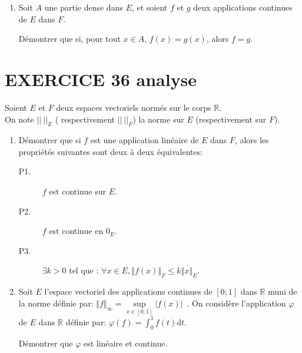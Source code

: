 \documentclass[10pt,oneside]{article}
\begin{document}
\begin{flushleft}
\begin{enumerate}
\item 
Soit $A$ une partie dense dans $E$, et soient $f$ et $g$ deux applications continues de $E$ dans $F$.

Démontrer que si, pour tout $x\in A$, $f(x)=g(x)$, alors $f=g$.
\end{enumerate}


\section*{EXERCICE 36 \:analyse }



Soient $E$ et $F$ deux espaces vectoriels normés sur le corps $\mathbb R$.\\
On note $||\:||_{E}$ ( respectivement $||\:||_{F}$) la norme sur $E$ (respectivement sur $F$).

\begin{enumerate}
\item Démontrer que si $f$ est une application linéaire de $E$ dans $F$, alors les propriétés suivantes sont deux à deux équivalentes:

	\begin{description}
	\item[P1.] $f$ est continue sur $E$.
	\item[P2.] $f$ est continue en $0_E$.
	\item[P3.] $\exists k>0$ tel que : $\forall x\in E, \left\Vert f(x)\right\Vert_{F} \leqslant k\left\Vert x\right\Vert_E$.
	\end{description}

\item Soit $E$ l'espace vectoriel des applications  continues de $[0;1]$ dans $\mathbb{R}$ muni de la norme définie par: $\Vert f\Vert_{\infty}=\sup\limits_{x\in[0;1]}|f(x)|$~.
On considère l'application $\varphi$ de $E$ dans $\mathbb{R}$ définie par: $\varphi(f)=\displaystyle\int_0^1 f(t)\text{d}t$.\bigskip

Démontrer que $\varphi$ est linéaire et continue.

\end{enumerate}




\end{flushleft}
\end{document}
